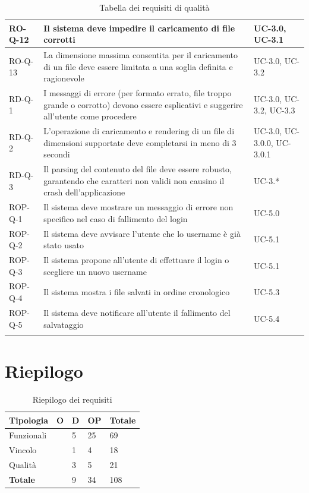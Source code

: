 \documentclass[11pt,a4paper]{article}
\begin{document}
\begin{longtable}{|p{}|>{\raggedright\arraybackslash}p{}|p{}|}
\hline
RO-Q-12 & Il sistema deve impedire il caricamento di file corrotti & UC-3.0, UC-3.1\\
\hline
RO-Q-13 & La dimensione massima consentita per il caricamento di un file deve essere limitata a una soglia definita e ragionevole & UC-3.0, UC-3.2 \\
\hline
RD-Q-1 & I messaggi di errore (per formato errato, file troppo grande o corrotto) devono essere esplicativi e suggerire all'utente come procedere & UC-3.0, UC-3.2, UC-3.3 \\
\hline
RD-Q-2 & L'operazione di caricamento e rendering di un file di dimensioni supportate deve completarsi in meno di 3 secondi & UC-3.0, UC-3.0.0, UC-3.0.1 \\
\hline
RD-Q-3 & Il parsing del contenuto del file deve essere robusto, garantendo che caratteri non validi non causino il crash dell'applicazione & UC-3.* \\
\hline
ROP-Q-1 & Il sistema deve mostrare un messaggio di errore non specifico nel caso di fallimento del login & UC-5.0 \\
\hline
ROP-Q-2 & Il sistema deve avvisare l'utente che lo username è già stato usato & UC-5.1 \\
\hline
ROP-Q-3 & Il sistema propone all'utente di effettuare il login o scegliere un nuovo username & UC-5.1 \\
\hline
ROP-Q-4 & Il sistema mostra i file salvati in ordine cronologico & UC-5.3 \\
\hline
ROP-Q-5 & Il sistema deve notificare all'utente il fallimento del salvataggio & UC-5.4 \\
\hline
\addlinespace[1em]
\caption{Tabella dei requisiti di qualità}
\end{longtable}

\newpage

\section{Riepilogo}
\begin{table}[H]
\centering
\begin{tabular}{|p{}|>{\raggedright\arraybackslash}p{}|p{}|p{}|p{}|}
\hline
\textbf{Tipologia} & \textbf{O} & \textbf{D} & \textbf{OP} & \textbf{Totale}\\
\hline
Funzionali & 39 & 5 & 25 & 69 \\
\hline
Vincolo & 13 & 1 & 4 & 18 \\
\hline
Qualità & 13 & 3 & 5 & 21 \\
\hline
\textbf{Totale} & 65 & 9 & 34 & 108\\
\hline
\end{tabular}
\caption{Riepilogo dei requisiti}
\end{table}
\end{document}
